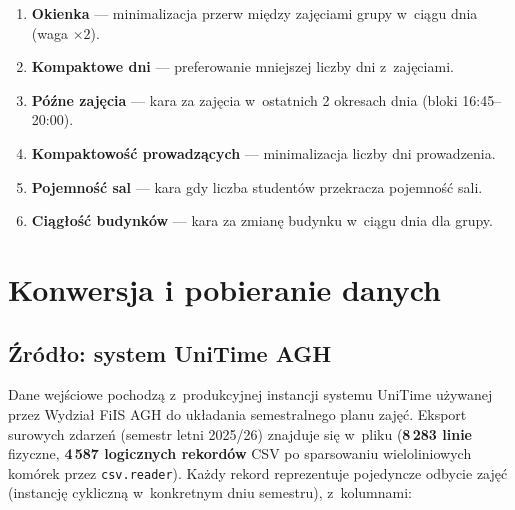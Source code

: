 \documentclass{common/sprawozdanie-agh}
\begin{document}
\begin{enumerate}
    \item \textbf{Okienka} --- minimalizacja przerw między zajęciami grupy w~ciągu dnia (waga $\times 2$).
    \item \textbf{Kompaktowe dni} --- preferowanie mniejszej liczby dni z~zajęciami.
    \item \textbf{Późne zajęcia} --- kara za zajęcia w~ostatnich 2 okresach dnia (bloki 16:45--20:00).
    \item \textbf{Kompaktowość prowadzących} --- minimalizacja liczby dni prowadzenia.
    \item \textbf{Pojemność sal} --- kara gdy liczba studentów przekracza pojemność sali.
    \item \textbf{Ciągłość budynków} --- kara za zmianę budynku w~ciągu dnia dla grupy.
\end{enumerate}

\section{Konwersja i pobieranie danych}
\label{sec:unitime}

\subsection{Źródło: system UniTime AGH}

Dane wejściowe pochodzą z~produkcyjnej instancji systemu UniTime używanej przez Wydział FiIS AGH do układania semestralnego planu zajęć. Eksport surowych zdarzeń (semestr letni 2025/26) znajduje się w~pliku  (\textbf{8\,283 linie} fizyczne, \textbf{4\,587 logicznych rekordów} CSV po sparsowaniu wieloliniowych komórek przez \texttt{csv.reader}). Każdy rekord reprezentuje pojedyncze odbycie zajęć (instancję cykliczną w~konkretnym dniu semestru), z~kolumnami:
\end{document}
